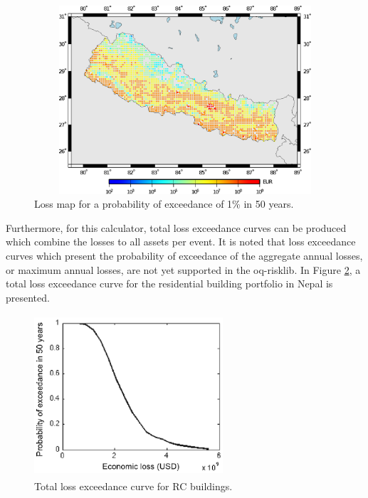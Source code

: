 \begin{figure}[ht]
\centering
\includegraphics[width=12cm,height=7cm]{./figures/risk/LossMap001.eps} 
\caption{Loss map for a probability of exceedance of 1\% in 50 years.}
\label{fig:LossCurve01}
\end{figure} 

Furthermore, for this calculator, total loss exceedance curves can be produced which combine the losses to all \glspl{asset} per event. It is noted that loss exceedance curves which present the probability of exceedance of the aggregate annual losses, or maximum annual losses, are not yet supported in the oq-risklib. In Figure \ref{fig:ProbLosses}, a total loss exceedance curve for the residential building portfolio in Nepal is presented. 
 
\begin{figure}[ht]
\centering
\includegraphics[width=7cm,height=6cm]{./figures/risk/LossCurveIstanbul.eps}
\caption{Total loss exceedance curve for RC buildings.}
\label{fig:ProbLosses}
\end{figure} 